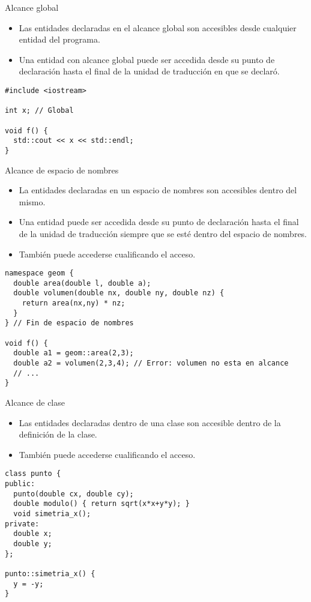\begin{frame}[fragile]{Alcance global}
\begin{itemize}
  \item Las entidades declaradas en el alcance global son accesibles desde cualquier entidad del programa.
  \item Una entidad con alcance global puede ser accedida desde su punto de declaración hasta el final de la unidad
        de traducción en que se declaró.
\end{itemize}
\begin{lstlisting}
#include <iostream>

int x; // Global

void f() {
  std::cout << x << std::endl;
}
\end{lstlisting}
\end{frame}

\begin{frame}[fragile]{Alcance de espacio de nombres}
\begin{itemize}
  \item La entidades declaradas en un espacio de nombres son accesibles dentro del mismo.
  \item Una entidad puede ser accedida desde su punto de declaración hasta el final de la unidad de traducción
        siempre que se esté dentro del espacio de nombres.
  \item También puede accederse cualificando el acceso.
\end{itemize}
\begin{lstlisting}
namespace geom {
  double area(double l, double a);
  double volumen(double nx, double ny, double nz) {
    return area(nx,ny) * nz;
  }
} // Fin de espacio de nombres

void f() {
  double a1 = geom::area(2,3);
  double a2 = volumen(2,3,4); // Error: volumen no esta en alcance
  // ...
}
\end{lstlisting}
\end{frame}

\begin{frame}[fragile]{Alcance de clase}
\begin{itemize}
  \item Las entidades declaradas dentro de una clase son accesible dentro de la definición de la clase.
  \item También puede accederse cualificando el acceso.
\end{itemize}
\begin{lstlisting}
class punto {
public:
  punto(double cx, double cy);
  double modulo() { return sqrt(x*x+y*y); }
  void simetria_x();
private:
  double x;
  double y;
};

punto::simetria_x() {
  y = -y;
}

\end{lstlisting}
\end{frame}

